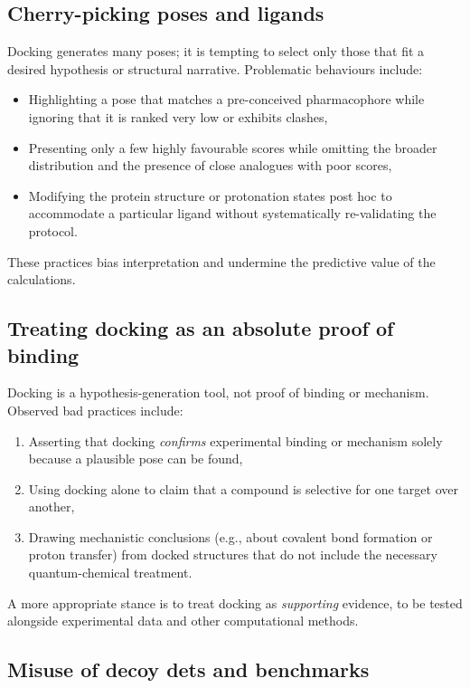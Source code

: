 \documentclass[12pt]{article}
\begin{document}
\subsection{Cherry-picking poses and ligands}

Docking generates many poses; it is tempting to select only those that fit a desired hypothesis or structural narrative. Problematic behaviours include:

\begin{itemize}
  \item Highlighting a pose that matches a pre-conceived pharmacophore while ignoring that it is ranked very low or exhibits clashes,
  \item Presenting only a few highly favourable scores while omitting the broader distribution and the presence of close analogues with poor scores,
  \item Modifying the protein structure or protonation states post hoc to accommodate a particular ligand without systematically re-validating the protocol.
\end{itemize}

These practices bias interpretation and undermine the predictive value of the calculations.

\subsection{Treating docking as an absolute proof of binding}

Docking is a hypothesis-generation tool, not proof of binding or mechanism. Observed bad practices include:

\begin{enumerate}
  \item Asserting that docking \emph{confirms} experimental binding or mechanism solely because a plausible pose can be found,
  \item Using docking alone to claim that a compound is selective for one target over another,
  \item Drawing mechanistic conclusions (e.g., about covalent bond formation or proton transfer) from docked structures that do not include the necessary quantum-chemical treatment.
\end{enumerate}

A more appropriate stance is to treat docking as \emph{supporting} evidence, to be tested alongside experimental data and other computational methods.

\subsection{Misuse of decoy dets and benchmarks}
\end{document}
